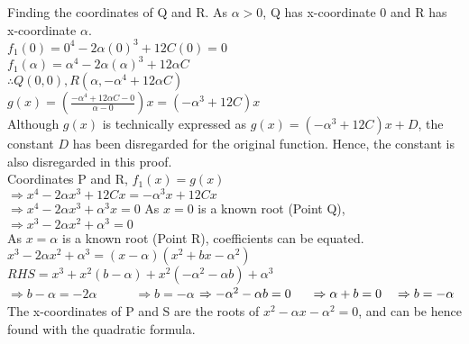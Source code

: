 \documentclass{homework}
\begin{document}
\begin{flushleft}
\begin{paracol}{2}
Finding the coordinates of Q and R. As $\alpha>0$, Q has x-coordinate 0 and R has x-coordinate $\alpha$. \vspace{0.6em} \\
$f_1(0)=0^4-2\alpha(0)^3+12C(0)=0$ \vspace{0.8em}\\
$f_1(\alpha)=\alpha^4-2\alpha (\alpha)^3+12\alpha C$ \vspace{0.8em}\\
$\therefore Q(0,0), R(\alpha, -\alpha^4+12\alpha C)$ \vspace{0.8em}\\
$g(x)=(\frac{-\alpha^4+12\alpha C-0}{\alpha-0})x=(-\alpha^3+12C)x$ \vspace{0.8em}\\ 
Although $g(x)$ is technically expressed as $g(x)=(-\alpha^3+12C)x+D$, the constant $D$ has been disregarded for the original function. Hence, the constant is also disregarded in this proof. \vspace{0.8em}\\ 
Coordinates P and R, $f_1(x)=g(x)$ \vspace{0.8em}\\ 
$\Rightarrow x^4-2\alpha x^3+12Cx=-\alpha^3x+12Cx$ \vspace{0.8em}\\ 
$\Rightarrow x^4-2\alpha x^3+\alpha ^3x=0$ \switchcolumn
\vspace{2em}
As $x=0$ is a known root (Point Q), $\Rightarrow x^3-2\alpha x^2+\alpha^3=0$  \vspace{0.8em}\\
As $x=\alpha$ is a known root (Point R), coefficients can be equated. \vspace{0.8em}\\
$x^3-2\alpha x^2+\alpha^3=(x-\alpha)(x^2+bx-\alpha^2)$ \vspace{0.8em}\\
$RHS = x^3+x^2(b-\alpha)+x^2(-\alpha^2-\alpha b)+\alpha^3$ \vspace{0.8em}\\
$\Rightarrow b-\alpha=-2\alpha \hspace{3em} \Rightarrow b=-\alpha$
$\Rightarrow -\alpha^2-\alpha b=0 \hspace{1.5em} \Rightarrow \alpha+b=0 \hspace{1em}\Rightarrow b=-\alpha$ \vspace{0.8em} \\
The x-coordinates of P and S are the roots of $x^2-\alpha x-\alpha^2=0$, and can be hence found with the quadratic formula. \vspace{0.8em} \\

\end{paracol}
\end{flushleft}
\end{document}
